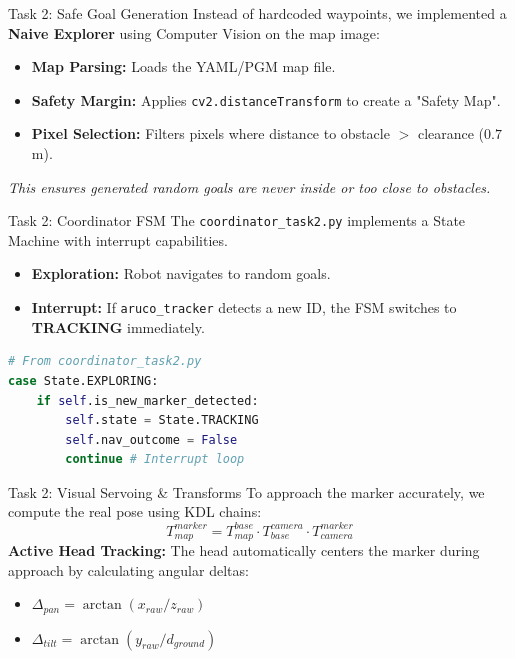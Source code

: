 \begin{frame}{Task 2: Safe Goal Generation}
    Instead of hardcoded waypoints, we implemented a \textbf{Naive Explorer} using Computer Vision on the map image:
    \vspace{0.2cm}
    \begin{itemize}
        \item \textbf{Map Parsing:} Loads the YAML/PGM map file.
        \item \textbf{Safety Margin:} Applies \texttt{cv2.distanceTransform} to create a "Safety Map".
        \item \textbf{Pixel Selection:} Filters pixels where distance to obstacle $>$ clearance ($0.7$m).
    \end{itemize}
    \begin{center}
        \textit{This ensures generated random goals are never inside or too close to obstacles.}
    \end{center}
\end{frame}

\begin{frame}[fragile]{Task 2: Coordinator FSM}
    The \texttt{coordinator\_task2.py} implements a State Machine with interrupt capabilities.
    \begin{itemize}
        \item \textbf{Exploration:} Robot navigates to random goals.
        \item \textbf{Interrupt:} If \texttt{aruco\_tracker} detects a new ID, the FSM switches to \textbf{TRACKING} immediately.
    \end{itemize}
    \begin{lstlisting}[language=Python]
# From coordinator_task2.py
case State.EXPLORING:
    if self.is_new_marker_detected:
        self.state = State.TRACKING
        self.nav_outcome = False 
        continue # Interrupt loop
    \end{lstlisting}
\end{frame}

\begin{frame}{Task 2: Visual Servoing \& Transforms}
    To approach the marker accurately, we compute the real pose using KDL chains:
    \vspace{0.2cm}
    $$ T_{map}^{marker} = T_{map}^{base} \cdot T_{base}^{camera} \cdot T_{camera}^{marker} $$
    \vspace{0.2cm}
    \textbf{Active Head Tracking:}
    The head automatically centers the marker during approach by calculating angular deltas:
    \begin{itemize}
        \item $\Delta_{pan} = \arctan(x_{raw} / z_{raw})$
        \item $\Delta_{tilt} = \arctan(y_{raw} / d_{ground})$
    \end{itemize}
\end{frame}


